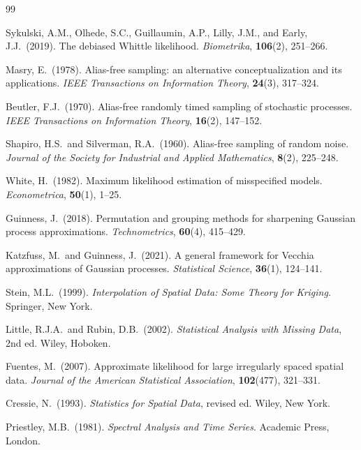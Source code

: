 \documentclass[12pt]{article}
\begin{document}
\bigskip
\begin{thebibliography}{99}

Sykulski, A.M., Olhede, S.C., Guillaumin, A.P., Lilly, J.M., and Early, J.J.\
(2019).
The debiased Whittle likelihood.
\emph{Biometrika}, \textbf{106}(2), 251--266.

Masry, E.\ (1978).
Alias-free sampling: an alternative conceptualization and its applications.
\emph{IEEE Transactions on Information Theory}, \textbf{24}(3), 317--324.

Beutler, F.J.\ (1970).
Alias-free randomly timed sampling of stochastic processes.
\emph{IEEE Transactions on Information Theory}, \textbf{16}(2), 147--152.

Shapiro, H.S.\ and Silverman, R.A.\ (1960).
Alias-free sampling of random noise.
\emph{Journal of the Society for Industrial and Applied Mathematics},
\textbf{8}(2), 225--248.

White, H.\ (1982).
Maximum likelihood estimation of misspecified models.
\emph{Econometrica}, \textbf{50}(1), 1--25.

Guinness, J.\ (2018).
Permutation and grouping methods for sharpening Gaussian process
approximations.
\emph{Technometrics}, \textbf{60}(4), 415--429.

Katzfuss, M.\ and Guinness, J.\ (2021).
A general framework for Vecchia approximations of Gaussian processes.
\emph{Statistical Science}, \textbf{36}(1), 124--141.

Stein, M.L.\ (1999).
\emph{Interpolation of Spatial Data: Some Theory for Kriging}.
Springer, New York.

Little, R.J.A.\ and Rubin, D.B.\ (2002).
\emph{Statistical Analysis with Missing Data}, 2nd ed.
Wiley, Hoboken.

Fuentes, M.\ (2007).
Approximate likelihood for large irregularly spaced spatial data.
\emph{Journal of the American Statistical Association},
\textbf{102}(477), 321--331.

Cressie, N.\ (1993).
\emph{Statistics for Spatial Data}, revised ed.
Wiley, New York.

Priestley, M.B.\ (1981).
\emph{Spectral Analysis and Time Series}.
Academic Press, London.

\end{thebibliography}
\end{document}
